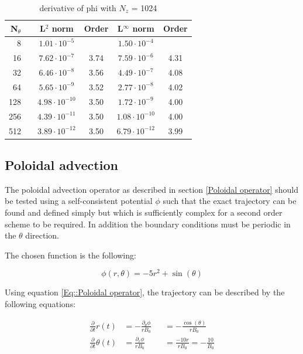 \begin{table}[ht]
\centering
 \begin{tabular}{|r c|c|c|c|c|}
  \hline
  \bf N$_\theta$ & & \bf L$^2$ norm       & \bf Order & \bf L$^\infty$ norm  & \bf Order\\
  \hline
  8  & & $ 1.01 \cdot 10^{ -5 }$ &       & $ 1.50 \cdot 10^{ -4 }$ &        \\
  \hline
  16  & & $ 7.62 \cdot 10^{ -7 }$ &  3.74  & $ 7.59 \cdot 10^{ -6 }$ &  4.31  \\
  \hline
  32  & & $ 6.46 \cdot 10^{ -8 }$ &  3.56  & $ 4.49 \cdot 10^{ -7 }$ &  4.08  \\
  \hline
  64  & & $ 5.65 \cdot 10^{ -9 }$ &  3.52  & $ 2.77 \cdot 10^{ -8 }$ &  4.02  \\
  \hline
  128  & & $ 4.98 \cdot 10^{ -10 }$ &  3.50  & $ 1.72 \cdot 10^{ -9 }$ &  4.00  \\
  \hline
  256  & & $ 4.39 \cdot 10^{ -11 }$ &  3.50  & $ 1.08 \cdot 10^{ -10 }$ &  4.00  \\
  \hline
  512  & & $ 3.89 \cdot 10^{ -12 }$ &  3.50  & $ 6.79 \cdot 10^{ -12 }$ &  3.99  \\
  \hline
 \end{tabular}
 \caption{\label{dPhi convergence theta} derivative of phi with $N_z$ = 1024}
\end{table}

\subsection{Poloidal advection}

The poloidal advection operator as described in section \ref{Poloidal operator} should be tested using a self-consistent potential $\phi$ such that the exact trajectory can be found and defined simply but which is sufficiently complex for a second order scheme to be required. In addition the boundary conditions must be periodic in the $\theta$ direction.

The chosen function is the following:

\begin{equation}
 \phi(r,\theta) = -5 r^2 + \sin(\theta)
\end{equation}

Using equation \ref{Eq::Poloidal operator}, the trajectory can be described by the following equations:

\begin{align*}
 \frac{\partial}{\partial t} r(t) &= - \frac{\partial_\theta\phi}{rB_0} &&= - \frac{\cos(\theta)}{rB_0}\\
 \frac{\partial}{\partial t} \theta(t) &= \frac{\partial_r\phi}{rB_0} &&= \frac{-10 r}{rB_0} = -\frac{10}{B_0}
\end{align*}


